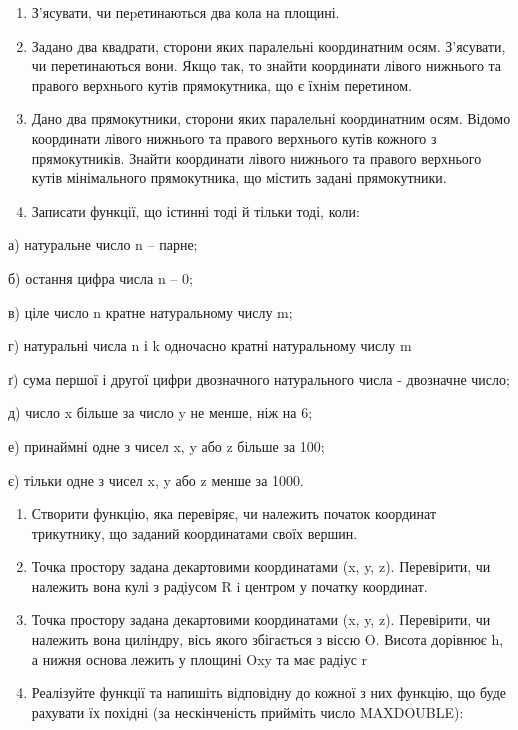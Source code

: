 \documentclass[]{article}
\begin{document}
\begin{enumerate}
\def\labelenumi{\arabic{enumi})}
\setcounter{enumi}{7}
\item
  З'ясувати, чи пеpетинаються два кола на площині.
\item
  Задано два квадрати, сторони яких паралельні координатним осям.
  З'ясувати, чи перетинаються вони. Якщо так, то знайти координати
  лівого нижнього та правого верхнього кутів прямокутника, що є їхнім
  перетином.
\item
  Дано два прямокутники, сторони яких паралельні координатним осям.
  Відомо координати лівого нижнього та правого верхнього кутів кожного з
  прямокутників. Знайти координати лівого нижнього та правого верхнього
  кутів мінімального прямокутника, що містить задані прямокутники.
\item
  Записати функції, що істинні тоді й тільки тоді, коли:
\end{enumerate}

а) натуральне число n -- парне;

б) остання цифра числа n -- 0;

в) ціле число n кратне натуральному числу m;

г) натуральні числа n і k одночасно кратні натуральному числу m

ґ) сума першої і другої цифри двозначного натурального числа - двозначне
число;

д) число x більше за число y не менше, ніж на 6;

е) принаймні одне з чисел x, y або z більше за 100;

є) тільки одне з чисел x, y або z менше за 1000.

\begin{enumerate}
\def\labelenumi{\arabic{enumi})}
\setcounter{enumi}{7}
\item
  Створити функцію, яка перевіряє, чи належить початок координат
  трикутнику, що заданий координатами своїх вершин.
\item
  Точка простору задана декартовими координатами (x, y, z). Перевірити,
  чи належить вона кулі з радіусом R i центром у початку координат.
\item
  Точка простору задана декартовими координатами (x, y, z). Перевірити,
  чи належить вона циліндру, вісь якого збігається з віссю O. Висота
  дорівнює h, а нижня основа лежить у площині Oxy та має радіус r
\item
  Реалізуйте функції та напишіть відповідну до кожної з них функцію, що
  буде рахувати їх похідні (за нескінченість прийміть число MAXDOUBLE):
\end{enumerate}
\end{document}
